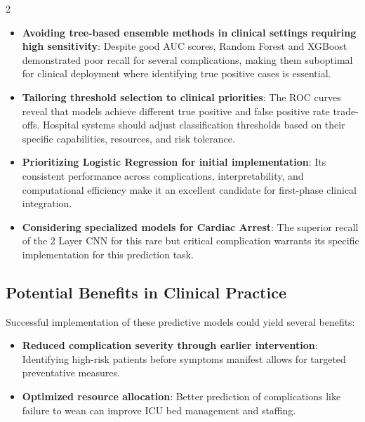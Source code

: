 \documentclass[bst/sn-nature]{sn-jnl}
\begin{document}
\begin{multicols}{2}
\begin{itemize}
    \item \textbf{Avoiding tree-based ensemble methods in clinical settings requiring high sensitivity}: Despite good AUC scores, Random Forest and XGBoost demonstrated poor recall for several complications, making them suboptimal for clinical deployment where identifying true positive cases is essential. \\
    
    \item \textbf{Tailoring threshold selection to clinical priorities}: The ROC curves reveal that models achieve different true positive and false positive rate trade-offs. Hospital systems should adjust classification thresholds based on their specific capabilities, resources, and risk tolerance. \\
    
    \item \textbf{Prioritizing Logistic Regression for initial implementation}: Its consistent performance across complications, interpretability, and computational efficiency make it an excellent candidate for first-phase clinical integration. \\
    
    \item \textbf{Considering specialized models for Cardiac Arrest}: The superior recall of the 2 Layer CNN for this rare but critical complication warrants its specific implementation for this prediction task.
\end{itemize}

\subsection{Potential Benefits in Clinical Practice}

\quad Successful implementation of these predictive models could yield several benefits:

\begin{itemize}
    \item \textbf{Reduced complication severity through earlier intervention}: Identifying high-risk patients before symptoms manifest allows for targeted preventative measures. \\ 
    
    \item \textbf{Optimized resource allocation}: Better prediction of complications like failure to wean can improve ICU bed management and staffing. \\
    

\end{itemize}
\end{multicols}
\end{document}
